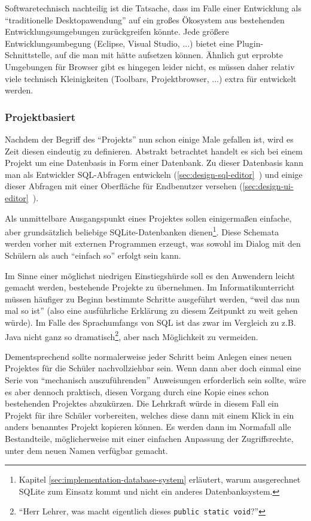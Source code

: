 Softwaretechnisch nachteilig ist die Tatsache, dass \idename im Falle einer Entwicklung als ``traditionelle Desktopawendung'' auf ein großes Ökosystem aus bestehenden Entwicklungsumgebungen zurückgreifen könnte. Jede größere Entwicklungsumbegung (Eclipse, Visual Studio, ...) bietet eine Plugin-Schnittstelle, auf die man mit \idename hätte aufsetzen können. Ähnlich gut erprobte Umgebungen für Browser gibt es hingegen leider nicht, es müssen daher relativ viele technisch Kleinigkeiten (Toolbars, Projektbrowser, ...) extra für \idename entwickelt werden.

\subsubsection{Projektbasiert}

Nachdem der Begriff des ``Projekts'' nun schon einige Male gefallen ist, wird es Zeit diesen eindeutig zu definieren. Abstrakt betrachtet handelt es sich bei einem Projekt um eine Datenbasis in Form einer Datenbank. Zu dieser Datenbasis kann man als Entwickler SQL-Abfragen entwickeln (\ref{sec:design-sql-editor}~) und einige dieser Abfragen mit einer Oberfläche für Endbenutzer versehen (\ref{sec:design-ui-editor}~).

Als unmittelbare Ausgangspunkt eines Projektes sollen einigermaßen einfache, aber grundsätzlich beliebige SQLite-Datenbanken dienen\footnote{Kapitel \ref{sec:implementation-database-system}  erläutert, warum ausgerechnet SQLite zum Einsatz kommt und nicht ein anderes Datenbanksystem.}. Diese Schemata werden vorher mit externen Programmen erzeugt, was sowohl im Dialog mit den Schülern als auch ``einfach so'' erfolgt sein kann.

Im Sinne einer möglichst niedrigen Einstiegshürde soll es den Anwendern leicht gemacht werden, bestehende Projekte zu übernehmen. Im Informatikunterricht müssen häufiger zu Beginn bestimmte Schritte ausgeführt werden, ``weil das nun mal so ist'' (also eine ausführliche Erklärung zu diesem Zeitpunkt zu weit gehen würde). Im Falle des Sprachumfangs von SQL ist das zwar im Vergleich zu z.B. Java nicht ganz so dramatisch\footnote{``Herr Lehrer, was macht eigentlich dieses \texttt{public static void}?''}, aber nach Möglichkeit zu vermeiden.

Dementsprechend sollte normalerweise jeder Schritt beim Anlegen eines neuen Projektes für die Schüler nachvollziehbar sein. Wenn dann aber doch einmal eine Serie von ``mechanisch auszuführenden'' Anweisungen erforderlich sein sollte, wäre es aber dennoch praktisch, diesen Vorgang durch eine Kopie eines schon bestehenden Projektes abzukürzen. Die Lehrkraft würde in diesem Fall ein Projekt für ihre Schüler vorbereiten, welches diese dann mit einem Klick in ein anders benanntes Projekt kopieren können. Es werden dann im Normafall alle Bestandteile, möglicherweise mit einer einfachen Anpassung der Zugriffsrechte, unter dem neuen Namen verfügbar gemacht.

